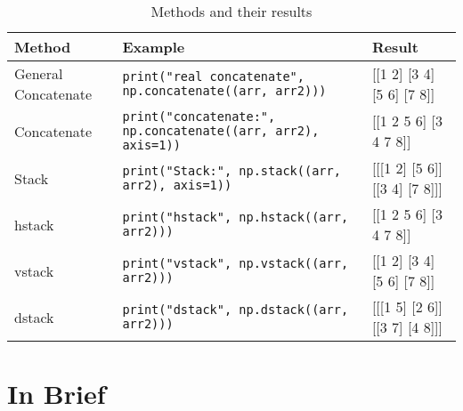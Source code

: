 \documentclass[openany]{book}
\begin{document}
\begin{table}[htbp]
    \centering
    \begin{tabular}{|p{2cm}|p{10cm}|p{4cm}|}
        \hline
        Method & Example & Result \\
        \hline
        General Concatenate & \texttt{print("real concatenate", np.concatenate((arr, arr2)))} & [[1 2] [3 4] [5 6] [7 8]] \\ \hline
        Concatenate & \texttt{print("concatenate:", np.concatenate((arr, arr2), axis=1))} & [[1 2 5 6] [3 4 7 8]] \\  \hline
        Stack & \texttt{print("Stack:", np.stack((arr, arr2), axis=1))} & [[[1 2] [5 6]] [[3 4] [7 8]]] \\ \hline
        hstack & \texttt{print("hstack", np.hstack((arr, arr2)))} & [[1 2 5 6] [3 4 7 8]] \\ \hline
        vstack & \texttt{print("vstack", np.vstack((arr, arr2)))} & [[1 2] [3 4] [5 6] [7 8]] \\ \hline
        dstack & \texttt{print("dstack", np.dstack((arr, arr2)))} & [[[1 5] [2 6]] [[3 7] [4 8]]] \\ \hline
        \hline
    \end{tabular}
    \caption{Methods and their results}
    \label{tab:methods_results}
\end{table}

\chapter{In Brief}
\end{document}
